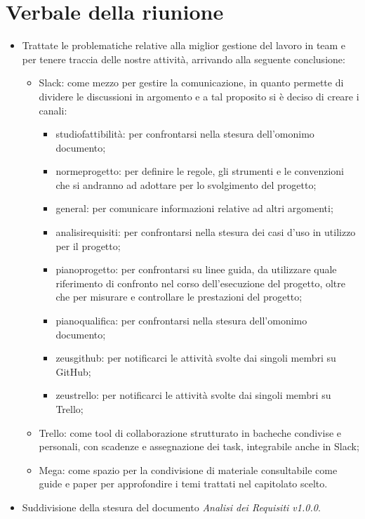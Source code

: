 \section{Verbale della riunione}
\begin{itemize}
	\item Trattate le problematiche relative alla miglior gestione del lavoro in team e per tenere traccia delle nostre attività, arrivando alla seguente conclusione:
	\begin{itemize}
		\item Slack\glo: come mezzo per gestire la comunicazione, in quanto permette di dividere le discussioni in argomento e a tal proposito si è deciso di creare i canali:
		\begin{itemize}
			\item studiofattibilità: per confrontarsi nella stesura dell'omonimo documento;
			\item normeprogetto: per definire le regole, gli strumenti e le convenzioni che si andranno ad adottare per lo svolgimento del progetto;
			\item general: per comunicare informazioni relative ad altri argomenti;
			\item analisirequisiti: per confrontarsi nella stesura dei casi d'uso in utilizzo per il progetto;
			\item pianoprogetto: per confrontarsi su linee guida, da utilizzare quale riferimento di confronto nel corso dell’esecuzione del progetto, oltre che per misurare e controllare le prestazioni del progetto;
			\item pianoqualifica: per confrontarsi nella stesura dell'omonimo documento;
			\item zeusgithub: per notificarci le attività svolte dai singoli membri su GitHub;
			\item zeustrello: per notificarci le attività svolte dai singoli membri su Trello;
		\end{itemize}  
		\item Trello\glo: come tool di collaborazione strutturato in bacheche condivise e personali, con scadenze e assegnazione dei task, integrabile anche in Slack;
		\item Mega: come spazio per la condivisione di materiale consultabile come guide e paper per approfondire i temi trattati nel capitolato scelto.
	\end{itemize}
	\item Suddivisione della stesura del documento \textit{Analisi dei Requisiti v1.0.0}. 
\end{itemize} 
\pagebreak
